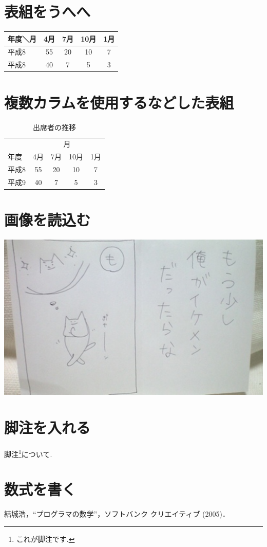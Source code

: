 \documentclass[10pt, twocolumn]{jarticle}
\begin{document}
\section{表組をうへへ}

\begin{center}
\begin{tabular}{|l|c|c|c|c|}\hline %
年度＼月 & 4月 & 7月 & 10月 & 1月 \\ \hline\hline
平成8    &  55 &  20 &   10 &   7 \\ \hline
平成8    &  40 &   7 &    5 &   3 \\ \hline
\end{tabular}
\end{center}

\section{複数カラムを使用するなどした表組}

\begin{table}[b]
\begin{center}
\caption{出席者の推移}
\begin{tabular}{|l|c|c|c|c|}\hline
        &  \multicolumn{4}{c|}{月} \\ \cline{2-5}
  年度  &  4月 & 7月 & 10月 & 1月  \\ \hline
  平成8 &  55  & 20  &  10  &  7   \\ \hline
  平成9 &  40  &  7  &   5  &  3   \\ \hline
\end{tabular}
\end{center}
\end{table}

\section{画像を読込む}

\includegraphics{sample.eps}

\section{脚注を入れる}

脚注\footnote{これが脚注です.}について.

\section{数式を書く}

\begin{thebibliography}{9}
     結城浩，“プログラマの数学”，ソフトバンク クリエイティブ (2005)．
\end{thebibliography}
\end{document}
